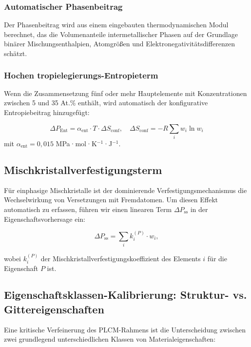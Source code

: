 \documentclass[12pt,a4paper]{article}
\begin{document}
\subsubsection{Automatischer Phasenbeitrag}
Der Phasenbeitrag wird aus einem eingebauten thermodynamischen Modul berechnet, das die Volumenanteile intermetallischer Phasen auf der Grundlage binärer Mischungsenthalpien, Atomgrößen und Elektronegativitätsdifferenzen schätzt.

\subsubsection{Hochen tropielegierungs-Entropieterm}
Wenn die Zusammensetzung fünf oder mehr Hauptelemente mit Konzentrationen zwischen 5 und 35 At.\% enthält, wird automatisch der konfigurative Entropiebeitrag hinzugefügt:

\begin{equation}
	\Delta P_{\text{Ent}} = \alpha_{\text{ent}} \cdot T \cdot \Delta S_{\text{conf}}, \quad
	\Delta S_{\text{conf}} = -R \sum_i w_i \ln w_i
\end{equation}
mit $\alpha_{\text{ent}} = 0,015$ MPa·mol·K\(^{-1}\)·J\(^{-1}\).

\subsection{Mischkristallverfestigungsterm}
\label{subsec:ss-term}

Für einphasige Mischkristalle ist der dominierende Verfestigungsmechanismus die Wechselwirkung von Versetzungen mit Fremdatomen. Um diesen Effekt automatisch zu erfassen, führen wir einen linearen Term $\Delta P_{\text{ss}}$ in der Eigenschaftsvorhersage ein:

\begin{equation}
	\Delta P_{\text{ss}} = \sum_i k_i^{(P)} \cdot w_i,
	\label{eq:ss-term}
\end{equation}

wobei $k_i^{(P)}$ der Mischkristallverfestigungskoeffizient des Elements $i$ für die Eigenschaft $P$ ist.

\subsection{Eigenschaftsklassen-Kalibrierung: Struktur- vs. Gittereigenschaften}
\label{subsec:property-class-calibration}

Eine kritische Verfeinerung des PLCM-Rahmens ist die Unterscheidung zwischen zwei grundlegend unterschiedlichen Klassen von Materialeigenschaften:
\end{document}
